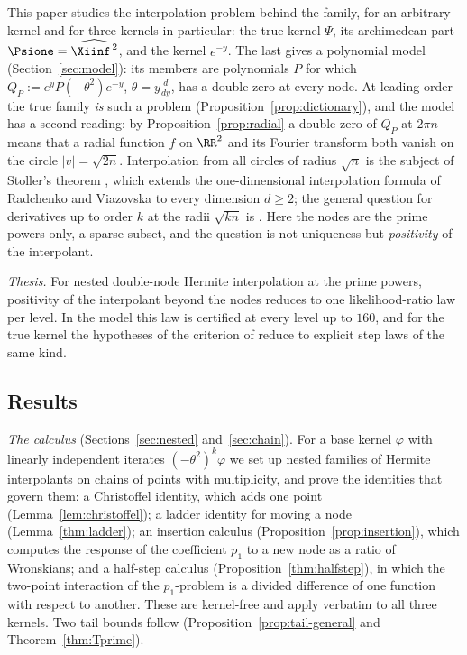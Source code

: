 This paper studies the interpolation problem behind the family, for an arbitrary kernel and for three kernels in
particular: the true kernel $\Psi$, its archimedean part $\Psione=\widehat{\Xiinf^{\,2}}$, and the kernel $e^{-y}$. The last
gives a polynomial model (Section~\ref{sec:model}): its members are polynomials $P$ for which $Q_P:=e^yP(-\theta^2)e^{-y}$,
$\theta=y\frac{d}{dy}$, has a double zero at every node. At leading order the true family \emph{is} such a problem
(Proposition~\ref{prop:dictionary}), and the model has a second reading: by Proposition~\ref{prop:radial} a double zero of
$Q_P$ at $2\pi n$ means that a radial function $f$ on $\RR^2$ and its Fourier transform both vanish on the circle
$\lvert v\rvert=\sqrt{2n}$. Interpolation from all circles of radius $\sqrt n$ is the subject of Stoller's theorem
\cite{Sto21}, which extends the one-dimensional interpolation formula of Radchenko and Viazovska \cite{RV19} to every
dimension $d\ge2$; the general question for derivatives up to order $k$ at the radii $\sqrt{kn}$ is
\cite[Open Problem~7.1]{CKMRV22}. Here the nodes are the prime powers only, a sparse subset, and the question is not
uniqueness but \emph{positivity} of the interpolant.

\emph{Thesis.} For nested double-node Hermite interpolation at the prime powers, positivity of the interpolant beyond the
nodes reduces to one likelihood-ratio law per level. In the model this law is certified at every level up to $160$, and
for the true kernel the hypotheses of the criterion of \cite{PaperI} reduce to explicit step laws of the same kind.

\subsection{Results}\label{ssec:intro-results}

\emph{The calculus} (Sections~\ref{sec:nested} and~\ref{sec:chain}). For a base kernel $\varphi$ with linearly independent
iterates $(-\theta^2)^k\varphi$ we set up nested families of Hermite interpolants on chains of points with multiplicity, and
prove the identities that govern them: a Christoffel identity, which adds one point
(Lemma~\ref{lem:christoffel}); a ladder identity for moving a node (Lemma~\ref{thm:ladder}); an insertion calculus
(Proposition~\ref{prop:insertion}), which computes the response of the coefficient $p_1$ to a new node as a ratio of
Wronskians; and a half-step calculus (Proposition~\ref{thm:halfstep}), in which the two-point interaction of the
$p_1$-problem is a divided difference of one function with respect to another. These are kernel-free and apply verbatim
to all three kernels. Two tail bounds follow (Proposition~\ref{prop:tail-general} and Theorem~\ref{thm:Tprime}).

